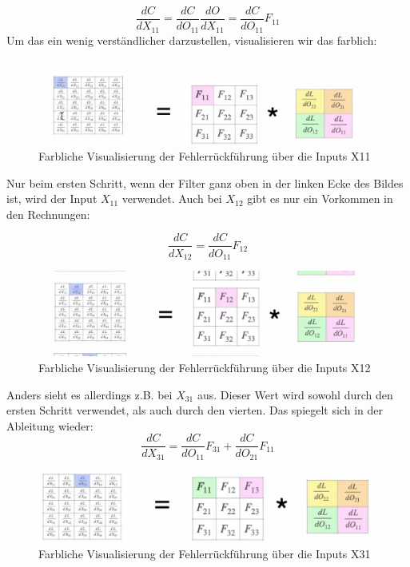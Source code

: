 \documentclass[12pt]{article}
\begin{document}
$$\frac {dC} {dX_{11}} = 
\frac {dC}{dO_{11}} \frac {dO}{dX_{11}} =
\frac {dC}{dO_{11}} F_{11}$$
Um das ein wenig verständlicher darzustellen, visualisieren wir das farblich:

\begin{figure}[H]
\centering
\includegraphics[scale=0.80]{Images/TemporaryPlaceholders/Farbliche Visualisierung der Fehlerrückführung über die Inputs X11.png}
\caption{Farbliche Visualisierung der Fehlerrückführung über die Inputs X11}
\label{Farbliche Visualisierung der Fehlerrückführung über die Inputs X11}
\end{figure}

Nur beim ersten Schritt, wenn der Filter ganz oben in der linken Ecke des Bildes ist, wird der Input $X_{11}$ verwendet. Auch bei $X_{12}$ gibt es nur ein Vorkommen in den Rechnungen:

$$\frac {dC} {dX_{12}} = \frac {dC}{dO_{11}} F_{12}$$

\begin{figure}[H]
\centering
\includegraphics[scale=0.80]{Images/TemporaryPlaceholders/Farbliche Visualisierung der Fehlerrückführung über die Inputs X12.png}
\caption{Farbliche Visualisierung der Fehlerrückführung über die Inputs X12}
\label{Farbliche Visualisierung der Fehlerrückführung über die Inputs X12}
\end{figure}

Anders sieht es allerdings z.B. bei $X_{31}$ aus. Dieser Wert wird sowohl durch den ersten Schritt verwendet, als auch durch den vierten. Das spiegelt sich in der Ableitung wieder:
$$\frac {dC} {dX_{31}} = \frac {dC}{dO_{11}} F_{31} + \frac {dC}{dO_{21}} F_{11}$$

\begin{figure}[H]
\centering
\includegraphics[scale=0.80]{Images/TemporaryPlaceholders/Farbliche Visualisierung der Fehlerrückführung über die Inputs X31.png}
\caption{Farbliche Visualisierung der Fehlerrückführung über die Inputs X31}
\label{Farbliche Visualisierung der Fehlerrückführung über die Inputs X31}
\end{figure}
\end{document}
